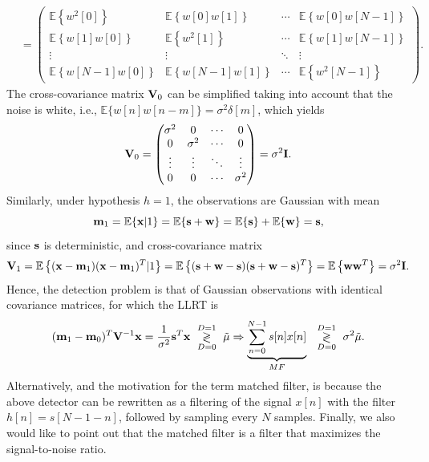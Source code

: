 \begin{example}
\begin{align*}
		&= \begin{pmatrix} \mathbb{E}\left\{w^2[0]\right\}  & \mathbb{E}\left\{w[0]w[1] \right\}& \cdots & \mathbb{E}\left\{w[0]w[N-1]\right\} \\ \mathbb{E}\left\{w[1] w[0]\right\} & \mathbb{E}\left\{w^2[1]\right\} & \cdots & \mathbb{E}\left\{w[1]w[N-1]\right\} \\ \vdots & \vdots & \ddots & \vdots   \\ \mathbb{E}\left\{w[N-1] w[0]\right\} & \mathbb{E}\left\{w[N-1] w[1]\right\} & \cdots & \mathbb{E}\left\{w^2[N-1] \right\} \end{pmatrix}.
 	\end{align*}
	The cross-covariance matrix ${\bf V}_0$ can be simplified taking into account that the noise is white, i.e., $\mathbb{E}\{w[n] w[n-m]\} = \sigma^2 \delta[m]$, which yields 
	\begin{equation*}
		{\bf V}_0 = \begin{pmatrix} \sigma^2  & 0 & \cdots & 0 \\ 0 & \sigma^2 & \cdots & 0 \\ \vdots & \vdots & \ddots & \vdots   \\ 0 & 0 & \cdots & \sigma^2 \end{pmatrix} = \sigma^2 \mathbf{I}.
\end{equation*}
Similarly, under hypothesis $h=1$, the observations are Gaussian with mean
\begin{equation*}
	{\bf m}_1 = \mathbb{E}\{{\bf x}|1\} = \mathbb{E}\{{\bf s} + {\bf w}\} = \mathbb{E}\{{\bf s}\} + \mathbb{E}\{{\bf w}\} = {\bf s},
\end{equation*}
since ${\bf s}$ is deterministic, and cross-covariance matrix
	\begin{equation*}
{\bf V}_1 = \mathbb{E}\left\{({\bf x} - {\bf m}_1) ({\bf x} - {\bf m}_1)^T|1\right\} = \mathbb{E}\left\{({\bf s} + {\bf w} - {\bf s}) ({\bf s} + {\bf w} - {\bf s})^T\right\} = \mathbb{E}\left\{{\bf w} {\bf w}^T\right\} = \sigma^2 \mathbf{I}.
\end{equation*}
Hence, the detection problem is that of Gaussian observations with identical covariance matrices, for which the LLRT is
\begin{equation*}
({\bf m}_1-{\bf m}_0)^T {\bf V}^{-1}{\bf x} = \frac{1}{\sigma^2} {\bf s}^T {\bf x} \dunodcero \tilde{\mu} \Rightarrow \underbrace{\sum_{n = 0}^{N-1} s[n]x[n]}_{MF} \ \dunodcero \sigma^2 \tilde{\mu}.
\end{equation*}
Alternatively, and the motivation for the term matched filter, is because the above detector can be rewritten as a filtering of the signal $x[n]$ with the filter $h[n] = s[N-1 - n]$, followed by sampling every $N$ samples. Finally, we also would like to point out that the matched filter is a filter that maximizes the signal-to-noise ratio.

\end{example}

